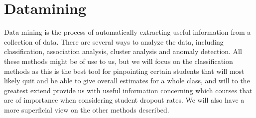 \section{Datamining}
Data mining is the process of automatically extracting useful information from a collection of data. There are several ways to analyze the data, including classification, association analysis, cluster analysis and anomaly detection. All these methods might be of use to us, but we will focus on the classification methods as this is the best tool for pinpointing certain students that will most likely quit and be able to give overall estimates for a whole class, and will to the greatest extend provide us with useful information concerning which courses that are of importance when considering student dropout rates. We will also have a more superficial view on the other methods described.




